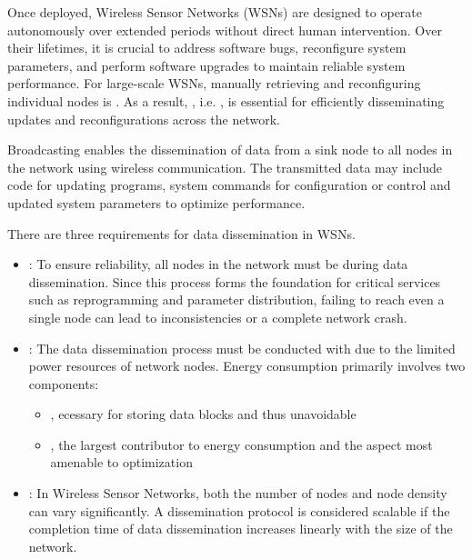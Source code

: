 \documentclass[a4paper, 12pt]{report}
\begin{document}
    Once deployed, Wireless Sensor Networks (WSNs) are designed to operate autonomously over extended periods without direct human intervention. Over their lifetimes, it is crucial to address software bugs, reconfigure system parameters, and perform software upgrades to maintain reliable system performance. For large-scale WSNs, manually retrieving and reconfiguring individual nodes is . As a result, , i.e. , is essential for efficiently disseminating updates and reconfigurations across the network.

    Broadcasting enables the dissemination of data from a sink node to all nodes in the network using wireless communication. The transmitted data may include code for updating programs, system commands for configuration or control and updated system parameters to optimize performance.

    There are three requirements for data dissemination in WSNs.

    \begin{itemize}
        \item {}: To ensure reliability, all nodes in the network must be  during data dissemination. Since this process forms the foundation for critical services such as reprogramming and parameter distribution, failing to reach even a single node can lead to inconsistencies or a complete network crash.
        \item {}: The data dissemination process must be conducted with  due to the limited power resources of network nodes. Energy consumption primarily involves two components:
            \begin{itemize}
                \item {}, ecessary for storing data blocks and thus unavoidable
                \item {}, the largest contributor to energy consumption and the aspect most amenable to optimization
            \end{itemize}
        \item {}: In Wireless Sensor Networks, both the number of nodes and node density can vary significantly. A dissemination protocol is considered scalable if the completion time of data dissemination increases linearly with the size of the network.
    \end{itemize}
\end{document}
